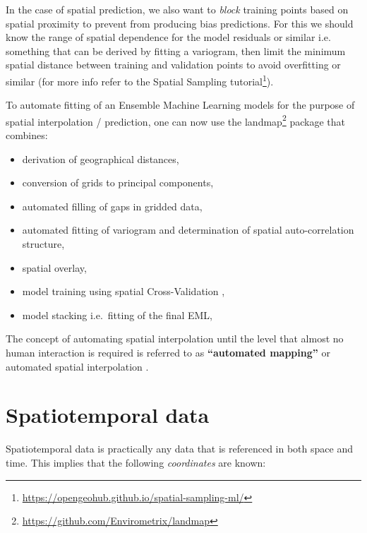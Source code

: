 \documentclass[
  graybox,natbib,nospthms]{svmono}
\providecommand{\tightlist}{%
  \setlength{\itemsep}{0pt}\setlength{\parskip}{0pt}}
\providecommand{\tightlist}{\setlength{\itemsep}{0pt}\setlength{\parskip}{0pt}}
\renewcommand{\href}[2]{#2 (\url{#1})}
\renewcommand{\href}[2]{#2\footnote{\url{#1}}}
\begin{document}
In the case of spatial prediction, we also want to \emph{block} training points based on
spatial proximity to prevent from producing bias predictions. For this we should
know the range of spatial dependence for the model residuals or similar i.e.~
something that can be derived by fitting a variogram, then limit the minimum
spatial distance between training and validation points to avoid overfitting or
similar (for more info refer to the \href{https://opengeohub.github.io/spatial-sampling-ml/}{Spatial Sampling tutorial}).

To automate fitting of an Ensemble Machine Learning models for the purpose of
spatial interpolation / prediction, one can now use the \href{https://github.com/Envirometrix/landmap}{landmap} package that combines:

\begin{itemize}
\tightlist
\item
  derivation of geographical distances,\\
\item
  conversion of grids to principal components,\\
\item
  automated filling of gaps in gridded data,\\
\item
  automated fitting of variogram and determination of spatial auto-correlation structure,\\
\item
  spatial overlay,\\
\item
  model training using spatial Cross-Validation \citep{lovelace2019geocomputation},\\
\item
  model stacking i.e.~fitting of the final EML,
\end{itemize}

The concept of automating spatial interpolation until the level that almost no
human interaction is required is referred to as \textbf{``automated mapping''} or automated
spatial interpolation \citep{pebesma2011intamap}.

\hypertarget{spatiotemporal-data}{%
\section{Spatiotemporal data}\label{spatiotemporal-data}}

Spatiotemporal data is practically any data that is referenced in both space and
time. This implies that the following \emph{coordinates} are known:
\end{document}
